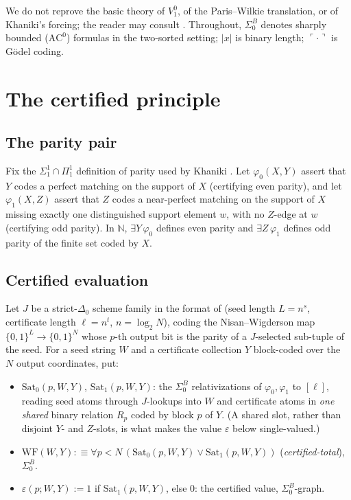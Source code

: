 \documentclass[11pt]{article}
\theoremstyle{definition}
\theoremstyle{remark}
\newcommand{\Vone}{V^0_1}
\newcommand{\Sat}{\mathrm{Sat}}
\newcommand{\WF}{\mathrm{WF}}
\newcommand{\SigmaB}{\Sigma^B_0}
\newcommand{\code}[1]{\ulcorner #1 \urcorner}
\begin{document}
We do not reprove the basic theory of $\Vone$, of the Paris--Wilkie translation,
or of Khaniki's forcing; the reader may consult
\cite{Krajicek1995,CookNguyen2010,Khaniki2022}. Throughout, $\SigmaB$ denotes
sharply bounded ($\mathrm{AC}^0$) formulas in the two-sorted setting; $|x|$ is
binary length; $\code{\cdot}$ is G\"odel coding.

\section{The certified principle}\label{sec:target}

\subsection{The parity pair}
Fix the $\Sigma^1_1\cap\Pi^1_1$ definition of parity used by Khaniki
\cite{Khaniki2022}. Let $\varphi_0(X,Y)$ assert that $Y$ codes a perfect
matching on the support of $X$ (certifying even parity), and let
$\varphi_1(X,Z)$ assert that $Z$ codes a near-perfect matching on the support of
$X$ missing exactly one distinguished support element $w$, with no $Z$-edge at
$w$ (certifying odd parity). In $\mathbb N$, $\exists Y\,\varphi_0$ defines even
parity and $\exists Z\,\varphi_1$ defines odd parity of the finite set coded by
$X$.

\subsection{Certified evaluation}\label{subsec:eval}
Let $J$ be a strict-$\Delta_0$ scheme family in the format of \cite{Khaniki2022}
(seed length $L=n^s$, certificate length $\ell=n^t$, $n=\log_2 N$), coding the
Nisan--Wigderson map $\{0,1\}^L\to\{0,1\}^N$ whose $p$-th output bit is the
parity of a $J$-selected sub-tuple of the seed. For a seed string $W$ and a
certificate collection $Y$ block-coded over the $N$ output coordinates, put:
\begin{itemize}
\item $\Sat_0(p,W,Y)$, $\Sat_1(p,W,Y)$: the $\SigmaB$ relativizations of
$\varphi_0,\varphi_1$ to $[\ell]$, reading seed atoms through $J$-lookups into
$W$ and certificate atoms in \emph{one shared} binary relation $R_p$ coded by
block $p$ of $Y$. (A shared slot, rather than disjoint $Y$- and $Z$-slots, is
what makes the value $\varepsilon$ below single-valued.)
\item $\WF(W,Y):\equiv\forall p<N\,(\Sat_0(p,W,Y)\vee\Sat_1(p,W,Y))$
(\emph{certified-total}), $\SigmaB$.
\item $\varepsilon(p;W,Y):=1$ if $\Sat_1(p,W,Y)$, else $0$: the certified value,
$\SigmaB$-graph.
\end{itemize}
\end{document}
